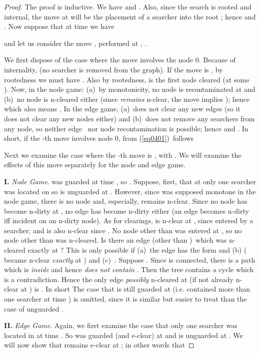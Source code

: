 \documentclass[11pt]{article}\usepackage{amsmath}
\begin{document}
\begin{proof}
The proof is inductive. We have  and . Also, since the search is rooted and internal, the move
at  will be the placement of a searcher into the root ; hence
 and . Now suppose that at time  we have

and let us consider the move , performed at , .

We first dispose of the case where the move involves the node 0. Because of
internality,  (no searcher is removed from the graph). If the move is
, by rootedness we must have . Also by rootedness,
 is the first node cleared (at some ). Now, in the node game:
(a)\ by monotonicity, no node is recontaminated at  and (b)\ no node is
n-cleared either (since  \emph{remains }n-clear, the move  implies ); hence  which also means . In the edge game,  (a)\ does not clear any new edges
(so it does not clear any new nodes either) and (b)\ does not remove any
searchers from any node, so neither edge \ nor node recontamination is
possible; hence 
and . In short, if
the -th move involves node 0, from (\ref{eq0401})\ follows



Next we examine the case where the -th move is
, with . We will examine the effects of this move
separately for the node and edge game. \noindent

\noindent\textbf{I.} \emph{Node Game}.  was guarded at time , so . Suppose, first, that at  only one searcher
was located on  so  is unguarded at . However, since 
was supposed monotone in the node game, there is no node    and, especially,
 remains n-clear. Since no node has become n-dirty at , no edge has
become n-dirty either (an edge becomes n-dirty iff incident on an n-dirty
node). As for clearings,  is n-clear at , since entered by a searcher;
and  is also n-clear since . No node other than  was entered at , so no
node other than  was n-cleared. Is there an edge (other than )\ which
was n-cleared exactly at ? This is only possible if (a)\ the edge has the
form  and (b) ( became n-clear \emph{exactly} at ) and (c)\ . Suppose
. Since  is connected,
there is a path  which is \emph{inside } and hence \emph{does not contain }. Then the tree
 contains a cycle  which is a contradiction.
Hence the only edge \emph{possibly} n-cleared at  (if not already n-clear
at ) is . In short
The case that  is still guarded at  (i.e.  contained more than one
searcher at time ) is omitted, since it is similar but easier to treat than
the case of unguarded . \noindent

\noindent\textbf{II. }\emph{Edge Game}. Again, we first examine the case that
only one searcher was located in  at time . So  was guarded (and
e-clear) at  and is unguarded at . We will now show that  remains
e-clear at ; in other words that


\end{proof}
\end{document}
